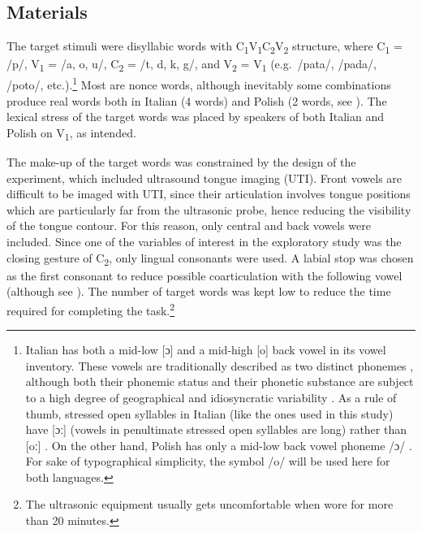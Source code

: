 \documentclass[12pt,]{article}
\let\rmarkdownfootnote\footnote%
\def\footnote{\protect\rmarkdownfootnote}
\begin{document}
\hypertarget{materials}{%
\subsection{Materials}\label{materials}}

\label{s:materials}

The target stimuli were disyllabic words with
C\textsubscript{1}V\textsubscript{1}C\textsubscript{2}V\textsubscript{2}
structure, where C\textsubscript{1} = /p/, V\textsubscript{1} = /a, o,
u/, C\textsubscript{2} = /t, d, k, g/, and V\textsubscript{2} =
V\textsubscript{1} (e.g.~/pata/, /pada/, /poto/,
etc.).\footnote{Italian has both a mid-low [ɔ] and a mid-high [o] back vowel in its vowel inventory. These vowels are traditionally described as two distinct phonemes \citep{kramer2009}, although both their phonemic status and their phonetic substance are subject to a high degree of geographical and idiosyncratic variability \citep{renwick2016}. As a rule of thumb, stressed open syllables in Italian (like the ones used in this study) have [ɔː] (vowels in penultimate stressed open syllables are long) rather than [oː] \citep{renwick2016}. On the other hand, Polish has only a mid-low back vowel phoneme /ɔ/ \citep{gussmann2007}. For sake of typographical simplicity, the symbol /o/ will be used here for both languages.}
Most are nonce words, although inevitably some combinations produce real
words both in Italian (4 words) and Polish (2 words, see
). The lexical stress of the target words was placed by
speakers of both Italian and Polish on V\textsubscript{1}, as intended.

The make-up of the target words was constrained by the design of the
experiment, which included ultrasound tongue imaging (UTI). Front vowels
are difficult to be imaged with UTI, since their articulation involves
tongue positions which are particularly far from the ultrasonic probe,
hence reducing the visibility of the tongue contour. For this reason,
only central and back vowels were included. Since one of the variables
of interest in the exploratory study was the closing gesture of
C\textsubscript{2}, only lingual consonants were used. A labial stop was
chosen as the first consonant to reduce possible coarticulation with the
following vowel (although see \citealt{vazquez-alvarez2007}). The number
of target words was kept low to reduce the time required for completing
the
task.\footnote{The ultrasonic equipment usually gets uncomfortable when wore for more than 20 minutes.
}
\end{document}
